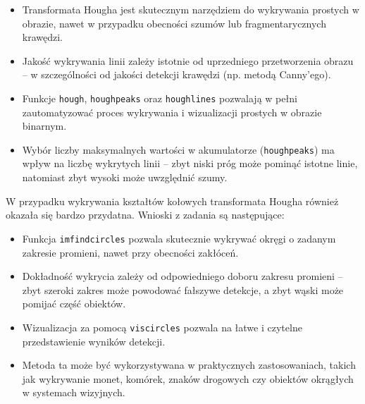\begin{itemize}
	\item Transformata Hougha jest skutecznym narzędziem do wykrywania prostych w obrazie, nawet w przypadku obecności szumów lub fragmentarycznych krawędzi.
	\item Jakość wykrywania linii zależy istotnie od uprzedniego przetworzenia obrazu – w szczególności od jakości detekcji krawędzi (np. metodą Canny'ego).
	\item Funkcje \texttt{hough}, \texttt{houghpeaks} oraz \texttt{houghlines} pozwalają w pełni zautomatyzować proces wykrywania i wizualizacji prostych w obrazie binarnym.
	\item Wybór liczby maksymalnych wartości w akumulatorze (\texttt{houghpeaks}) ma wpływ na liczbę wykrytych linii – zbyt niski próg może pominąć istotne linie, natomiast zbyt wysoki może uwzględnić szumy.
\end{itemize}

W przypadku wykrywania kształtów kołowych transformata Hougha również okazała się bardzo przydatna. Wnioski z zadania są następujące:
\begin{itemize}
	\item Funkcja \texttt{imfindcircles} pozwala skutecznie wykrywać okręgi o zadanym zakresie promieni, nawet przy obecności zakłóceń.
	\item Dokładność wykrycia zależy od odpowiedniego doboru zakresu promieni – zbyt szeroki zakres może powodować fałszywe detekcje, a zbyt wąski może pomijać część obiektów.
	\item Wizualizacja za pomocą \texttt{viscircles} pozwala na łatwe i czytelne przedstawienie wyników detekcji.
	\item Metoda ta może być wykorzystywana w praktycznych zastosowaniach, takich jak wykrywanie monet, komórek, znaków drogowych czy obiektów okrągłych w systemach wizyjnych.
\end{itemize}
